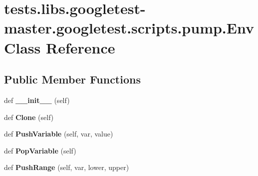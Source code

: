 \hypertarget{classtests_1_1libs_1_1googletest-master_1_1googletest_1_1scripts_1_1pump_1_1Env}{}\section{tests.\+libs.\+googletest-\/master.googletest.\+scripts.\+pump.\+Env Class Reference}
\label{classtests_1_1libs_1_1googletest-master_1_1googletest_1_1scripts_1_1pump_1_1Env}
\subsection*{Public Member Functions}
\begin{DoxyCompactItemize}
\item 
\mbox{\label{classtests_1_1libs_1_1googletest-master_1_1googletest_1_1scripts_1_1pump_1_1Env_af3c925b2072db7ab6e8746fd6fe668ff}} 
def {\bfseries \+\_\+\+\_\+init\+\_\+\+\_\+} (self)
\item 
\mbox{\label{classtests_1_1libs_1_1googletest-master_1_1googletest_1_1scripts_1_1pump_1_1Env_aa08740f30ab27b500083f2aedb5fd0b8}} 
def {\bfseries Clone} (self)
\item 
\mbox{\label{classtests_1_1libs_1_1googletest-master_1_1googletest_1_1scripts_1_1pump_1_1Env_ab193b12d050eb2a0d05aea69ff5412f5}} 
def {\bfseries Push\+Variable} (self, var, value)
\item 
\mbox{\label{classtests_1_1libs_1_1googletest-master_1_1googletest_1_1scripts_1_1pump_1_1Env_a03d65f064b3cf100cda84bd991cb36d0}} 
def {\bfseries Pop\+Variable} (self)
\item 
\mbox{\label{classtests_1_1libs_1_1googletest-master_1_1googletest_1_1scripts_1_1pump_1_1Env_aa7dc0dc2cbc045d629863a2c43b4c109}} 
def {\bfseries Push\+Range} (self, var, lower, upper)
\item 

\end{DoxyCompactItemize}
